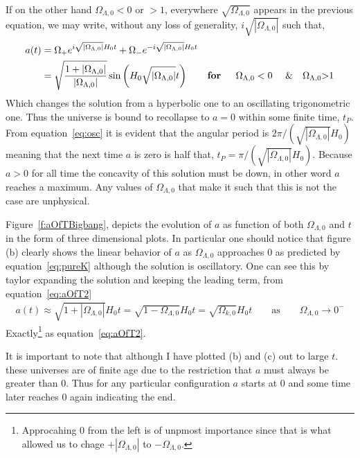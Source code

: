 \documentclass[twoside]{article}
\begin{document}
If on the other hand $\Omega_{\Lambda,0}<0$ or $>1$, everywhere $\sqrt{\Omega_{\Lambda,0}}$ appears in the previous equation, we may write, without any loss of generality, $i\sqrt{|\Omega_{\Lambda,0}|}$ such that,
\begin{align}
a(t)  &=  \Omega_{+}e^{i\sqrt{|\Omega_{\Lambda,0}|}H_{0}t}+\Omega_{-}e^{-i\sqrt{|\Omega_{\Lambda,0}|}H_{0}t}\label{eq:osc}\\
&=\sqrt{\frac{1+|\Omega_{\Lambda,0}|}{|\Omega_{\Lambda,0}|}}\sin\left(H_{0}\sqrt{|\Omega_{\Lambda,0}|}t\right)\qquad\text{\textbf{for \quad $\Omega_{\Lambda,0}<0$} \quad\&\quad $\Omega_{\Lambda,0}$>1}\label{eq:aOfT2}
\end{align}
Which changes the solution from a hyperbolic one to an oscillating trigonometric one. Thus the universe is bound to recollapse to $a = 0$ within some finite time, $t_{P}$. From equation~\ref{eq:osc} it is evident that the angular period is $2\pi/(\sqrt{|\Omega_{\Lambda,0}|}H_{0})$ meaning that the next time $a$ is zero is half that, $t_{P}=\pi/(\sqrt{|\Omega_{\Lambda,0}|}H_{0})$. Because $a>0$ for all time the concavity of this solution must be down, in other word $a$ reaches a maximum. Any values of $\Omega_{\Lambda,0}$ that make it such that this is not the case are unphysical.\par

Figure~\ref{f:aOfTBigbang}, depicts the evolution of $a$ as function of both $\Omega_{\Lambda,0}$ and $t$ in the form of three dimensional plots.  In particular one should notice that figure (b) clearly shows the linear behavior of $a$ as $\Omega_{\Lambda,0}$ approaches 0 as predicted by equation~\ref{eq:pureK} although the solution is oscillatory. One can see this by taylor expanding the solution and keeping the leading term, from equation~\ref{eq:aOfT2}
\begin{align}
a(t)\approx \sqrt{1+|\Omega_{\Lambda,0}|}H_{0}t = \sqrt{1-\Omega_{\Lambda,0}}H_{0}t  = \sqrt{\Omega_{k,0}}H_{0}t \qquad\text{as}\qquad \Omega_{\Lambda,0}\rightarrow 0^{-}
\end{align} 
Exactly\footnote{Approcahing 0 from the left is of unpmost importance since that is what allowed us to chage $+|\Omega_{\Lambda,0}|$ to $-\Omega_{\Lambda,0}$. } as equation~\ref{eq:aOfT2}. \par

It is important to note that although I have plotted (b) and (c) out to large $t$. these universes are of finite age due to the restriction that $a$ must always be greater than 0. Thus for any particular configuration $a$ starts at 0 and some time later reaches 0 again indicating the end.
\end{document}

